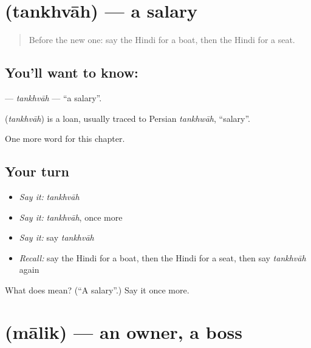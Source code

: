 \section[\texorpdfstring{\hi{तनख़्वाह} (tankhvāh)}{तनख़्वाह (tankhvāh)}]{ (tankhvāh) — a salary}

\label{lesson:HI-C182-tankhvah}



\begin{quote}
Before the new one: say the Hindi for a boat, then the Hindi for a seat.
\end{quote}

\subsection*{You'll want to know: }
\textbf{} — \emph{tankhvāh} — \textquotedblleft{}a salary\textquotedblright{}.

\begin{cousinweb}
\textbf{} (\emph{tankhvāh}) is a loan, usually traced to Persian \emph{tankhwāh}, \textquotedblleft{}salary\textquotedblright{}.
\end{cousinweb}

\begin{grammarlens}[title={What you've built}]
One more word for this chapter.
\end{grammarlens}

\subsection*{Your turn}
\begin{itemize}
\raggedright
  \item \emph{Say it:} \emph{tankhvāh}
  \item \emph{Say it:} \emph{tankhvāh}, once more
  \item \emph{Say it:} say \emph{tankhvāh}
  \item \emph{Recall:} say the Hindi for a boat, then the Hindi for a seat, then say \emph{tankhvāh} again
\end{itemize}

\begin{tcolorbox}[breakable,colback=teal!4,colframe=teal!35!black,title={Before you move on}]
What does  mean? (\textquotedblleft{}A salary\textquotedblright{}.) Say it once more.
\end{tcolorbox}
\section[\texorpdfstring{\hi{मालिक} (mālik)}{मालिक (mālik)}]{ (mālik) — an owner, a boss}

